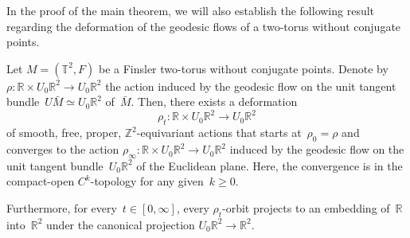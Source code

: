 \documentclass[AHL,Unicode,longabstracts,published]{cedram}
\newcommand{\Z}{\mathbb{Z}}
\newcommand{\R}{\mathbb{R}}
\newcommand{\T}{\mathbb{T}}
\begin{document}

In the proof of the main theorem, we will also establish the following result regarding the deformation of the geodesic flows of a two-torus without conjugate points.

\begin{theo}\label{theo:intro2}
Let $M=(\T^2,F)$ be a Finsler two-torus without conjugate points. Denote by $\rho:\R \times U_0\R^2 \to U_0\R^2$ the action induced by the geodesic flow on the unit tangent bundle~$U\bar{M} \simeq U_0\R^2$ of~$\bar{M}$. Then, there exists a deformation
\[
\rho_t:\R \times U_0\R^2 \to U_0\R^2
\]
of smooth, free, proper, $\Z^2$-equivariant actions that starts at~$\rho_0=\rho$ and converges to the action $\rho_\infty:\R \times U_0\R^2 \to U_0\R^2$ induced by the geodesic flow on the unit tangent bundle~$U_0\R^2$ of the Euclidean plane. Here, the convergence is in the compact-open $C^k$-topology for any given~\mbox{$k \geq 0$}.

Furthermore, for every~$t \in [0,\infty]$, every $\rho_t$-orbit projects to an embedding of~$\R$ into~$\R^2$ under the canonical projection $U_0\R^2 \to \R^2$.
\end{theo}
\end{document}
